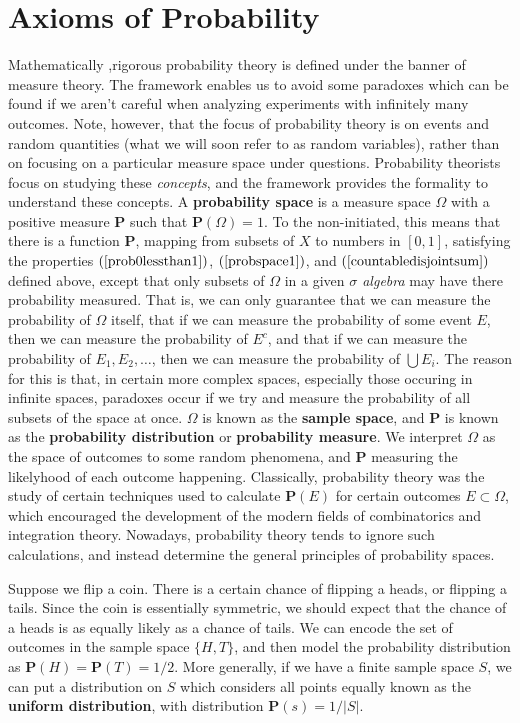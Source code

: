 \section{Axioms of Probability}

Mathematically ,rigorous probability theory is defined under the banner of measure theory. The framework enables us to avoid some paradoxes which can be found if we aren't careful when analyzing experiments with infinitely many outcomes. Note, however, that the focus of probability theory is on events and random quantities (what we will soon refer to as random variables), rather than on focusing on a particular measure space under questions. Probability theorists focus on studying these {\it concepts}, and the framework provides the formality to understand these concepts. A {\bf probability space} is a measure space $\Omega$ with a positive measure $\mathbf{P}$ such that $\mathbf{P}(\Omega) = 1$. To the non-initiated, this means that there is a function $\mathbf{P}$, mapping from subsets of $X$ to numbers in $[0,1]$, satisfying the properties $(\ref{prob0lessthan1})$, $(\ref{probspace1})$, and $(\ref{countabledisjointsum})$ defined above, except that only subsets of $\Omega$ in a given {\it $\sigma$ algebra} may have there probability measured. That is, we can only guarantee that we can measure the probability of $\Omega$ itself, that if we can measure the probability of some event $E$, then we can measure the probability of $E^c$, and that if we can measure the probability of $E_1, E_2, \dots$, then we can measure the probability of $\bigcup E_i$. The reason for this is that, in certain more complex spaces, especially those occuring in infinite spaces, paradoxes occur if we try and measure the probability of all subsets of the space at once. $\Omega$ is known as the {\bf sample space}, and $\mathbf{P}$ is known as the {\bf probability distribution} or {\bf probability measure}. We interpret $\Omega$ as the space of outcomes to some random phenomena, and $\mathbf{P}$ measuring the likelyhood of each outcome happening. Classically, probability theory was the study of certain techniques used to calculate $\mathbf{P}(E)$ for certain outcomes $E \subset \Omega$, which encouraged the development of the modern fields of combinatorics and integration theory. Nowadays, probability theory tends to ignore such calculations, and instead determine the general principles of probability spaces.

\begin{example}
    Suppose we flip a coin. There is a certain chance of flipping a heads, or flipping a tails. Since the coin is essentially symmetric, we should expect that the chance of a heads is as equally likely as a chance of tails. We can encode the set of outcomes in the sample space $\{ H, T \}$, and then model the probability distribution as $\mathbf{P}(H) = \mathbf{P}(T) = 1/2$. More generally, if we have a finite sample space $S$, we can put a distribution on $S$ which considers all points equally known as the {\bf uniform distribution}, with distribution $\mathbf{P}(s) = 1/|S|$.
\end{example}

